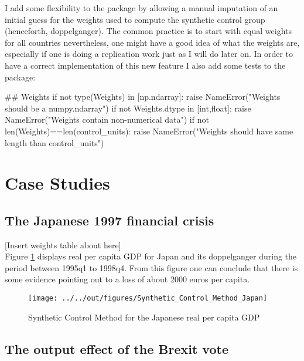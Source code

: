 \documentclass[11pt, a4paper, leqno]{article}
\begin{document}
I add some flexibility to the package by allowing a manual imputation of an initial guess for the weights used to compute the synthetic control group (henceforth, doppelganger). The common practice is to start with equal weights for all countries nevertheless, one might have a good idea of what the weights are, especially if one is doing a replication work just as I will do later on. In order to have a correct implementation of this new feature I also add some tests to the package: \\
\begin{python}
## Weights
if not type(Weights) in [np.ndarray]:
    raise NameError("Weights should be a numpy.ndarray")
if not Weights.dtype in [int,float]:
    raise NameError("Weights contain non-numerical data")
if not len(Weights)==len(control_units):
    raise NameError("Weights should have same length than control_units")
\end{python}



\section{Case Studies}

\subsection{The Japanese 1997 financial crisis}
\label{Japan}



[Insert weights table about here]\\

Figure \ref{JPN} displays real per capita GDP for Japan and its doppelganger during the period between 1995q1 to 1998q4. From this figure one can conclude that there is some evidence pointing out to a loss of about 2000 euros per capita. \\

\begin{figure}[!htbp]
    \caption{Synthetic Control Method for the Japanese real per capita GDP}
    \texttt{[image: ../../out/figures/Synthetic\_Control\_Method\_Japan]}
    \label{JPN}
\end{figure}

\clearpage

\subsection{The output effect of the Brexit vote}
\label{Brexit}
\end{document}
